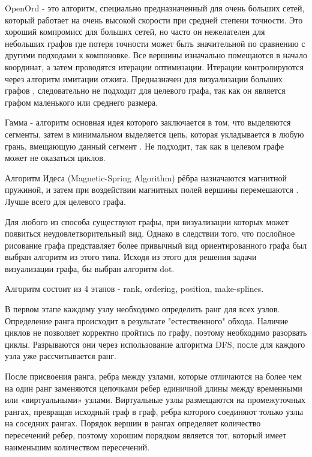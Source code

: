 OpenOrd - это алгоритм, специально предназначенный для очень больших сетей, который работает на очень высокой скорости при средней степени точности. Это хороший компромисс для больших сетей, но часто он нежелателен для небольших графов где потеря точности может быть значительной по сравнению с другими подходами к компоновке. Все вершины изначально помещаются в начало координат, а затем проводятся итерации оптимизации. Итерации контролируются через алгоритм имитации отжига. Предназначен для визуализации больших графов \cite{alg-open-ord}, следовательно не подходит для целевого графа, так как он является графом маленького или среднего размера.

Гамма - алгоритм основная идея которого заключается в том, что выделяются сегменты, затем в минимальном выделяется цепь, которая укладывается в любую грань, вмещающую данный сегмент \cite{alg-gamma}. Не подходит, так как в целевом графе может не оказаться циклов.

Алгоритм Идеса (Magnetic-Spring Algorithm) рёбра назначаются магнитной пружиной, и затем при воздействии магнитных полей вершины перемешаются \cite{alg-eades}. Лучше всего для целевого графа.

Для любого из способа существуют графы, при визуализации которых может появиться неудовлетворительный вид. Однако в следствии того, что послойное рисование графа представляет более привычный вид ориентированного графа был выбран алгоритм из этого типа. Исходя из этого для решения задачи визуализации графа, бы выбран алгоритм dot.

Алгоритм состоит из 4 этапов - \textsf{rank}, \textsf{ordering}, \textsf{position}, \textsf{make-splines}.

В первом этапе каждому узлу необходимо определить ранг для всех узлов. Определение ранга происходит в результате "естественного" обхода. Наличие циклов не позволяет корректно пройтись по графу, поэтому необходимо разорвать циклы. Разрываются они через использование алгоритма DFS, после для каждого узла уже рассчитывается ранг.

После присвоения ранга, ребра между узлами, которые отличаются на более чем на один ранг заменяются цепочками ребер единичной длины между временными или «виртуальными» узлами. Виртуальные узлы размещаются на промежуточных рангах, превращая исходный граф в граф, ребра которого соединяют только узлы на соседних рангах. Порядок вершин в рангах определяет количество пересечений ребер, поэтому хорошим порядком является тот, который имеет наименьшим количеством пересечений. 

